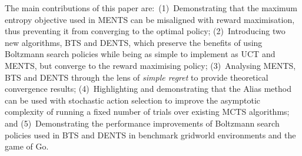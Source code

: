 \documentclass{article}
\theoremstyle{plain}
\begin{document}
    The main contributions of this paper are:~(1)~Demonstrating that the maximum entropy objective used in MENTS can be misaligned with reward maximisation, thus preventing it from converging to the optimal policy; (2)~Introducing two new algorithms, BTS and DENTS, which preserve the benefits of using Boltzmann search policies while being as simple to implement as UCT and MENTS, but converge to the reward maximising policy; (3)~Analysing MENTS, BTS and DENTS through the lens of \textit{simple regret} to provide theoretical convergence results; 
    (4)~Highlighting and demonstrating that the Alias method \cite{alias1,alias2} can be used with stochastic action selection to improve the asymptotic complexity of running a fixed number of trials over existing MCTS algorithms; and (5)~Demonstrating the performance improvements of Boltzmann search policies used in BTS and DENTS in benchmark gridworld environments and the game of Go.



    
\end{document}
